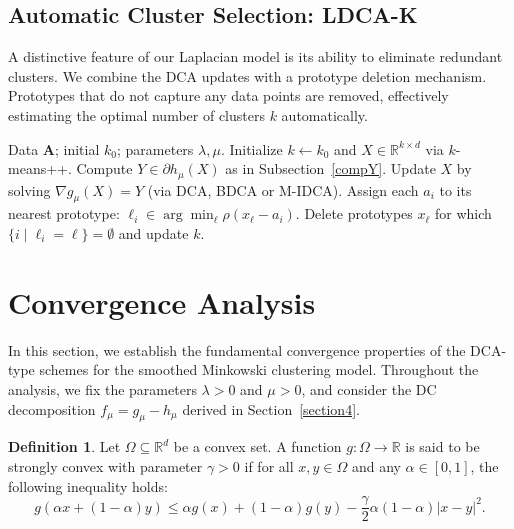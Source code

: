 \documentclass[11pt]{article}
\theoremstyle{definition}
\newtheorem{definition}[theorem]{Definition}
\newcommand{\1}{\mathbf{1}}
\begin{document}
\subsection{Automatic Cluster Selection: LDCA-K}

A distinctive feature of our Laplacian model is its ability to eliminate redundant clusters. We combine the DCA updates with a prototype deletion mechanism. Prototypes that do not capture any data points are removed, effectively estimating the optimal number of clusters $k$ automatically.

\begin{algorithm}[H]
\caption{Laplacian DCA with prototype deletion (LDCA-K)}
\label{alg:LDCA-K}
\begin{algorithmic}[1]
\Require Data $\mathbf{A}$; initial $k_0$; parameters $\lambda, \mu$.
\State Initialize $k \gets k_0$ and $X \in \mathbb{R}^{k \times d}$ via $k$-means++.
\Repeat
    \Repeat
        \State Compute $Y \in \partial h_\mu(X)$ as in Subsection~\ref{compY}.
        \State Update $X$ by solving $\nabla g_\mu(X) = Y$ (via DCA, BDCA or M-IDCA).
    \State Assign each $a_i$ to its nearest prototype: $\ell_i \in \arg\min_\ell \rho(x_\ell - a_i)$.
    \State Delete prototypes $x_\ell$ for which $\{i \mid \ell_i = \ell\} = \emptyset$ and update $k$.
\end{algorithmic}
\end{algorithm}
\section{Convergence Analysis} \label{section6}

In this section, we establish the fundamental convergence properties of the DCA-type schemes for the smoothed Minkowski clustering model. Throughout the analysis, we fix the parameters $\lambda > 0$ and $\mu > 0$, and consider the DC decomposition $f_\mu = g_\mu - h_\mu$ derived in Section~\ref{section4}.


\begin{definition}
    Let $\Omega \subseteq \mathbb{R}^d$ be a convex set. A function $g: \Omega \to \mathbb{R}$ is said to be strongly convex with parameter $\gamma > 0$ if for all $x, y \in \Omega$ and any $\alpha \in [0, 1]$, the following inequality holds:
\begin{equation*}
g(\alpha x + (1-\alpha)y) \le \alpha g(x) + (1-\alpha)g(y) - \frac{\gamma}{2}\alpha(1-\alpha)|x-y|^2.
\end{equation*}
\end{definition}
\end{document}
